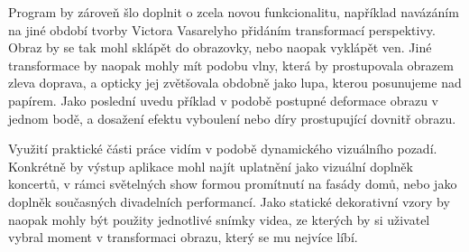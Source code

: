 Program by zároveň šlo doplnit o zcela novou funkcionalitu, například navázáním na jiné období tvorby Victora Vasarelyho přidáním transformací perspektivy. Obraz by se tak mohl sklápět do obrazovky, nebo naopak vyklápět ven. Jiné transformace by naopak mohly mít podobu vlny, která by prostupovala obrazem zleva doprava, a opticky jej zvětšovala obdobně jako lupa, kterou posunujeme nad papírem. Jako poslední uvedu příklad v podobě postupné deformace obrazu v jednom bodě, a dosažení efektu vyboulení nebo díry prostupující dovnitř obrazu.

Využití praktické části práce vidím v podobě dynamického vizuálního pozadí. Konkrétně by výstup aplikace mohl najít uplatnění jako vizuální doplněk koncertů, v rámci světelných show formou promítnutí na fasády domů, nebo jako doplněk současných divadelních performancí. Jako statické dekorativní vzory by naopak mohly být použity jednotlivé snímky videa, ze kterých by si uživatel vybral moment v transformaci obrazu, který se mu nejvíce líbí.


%
